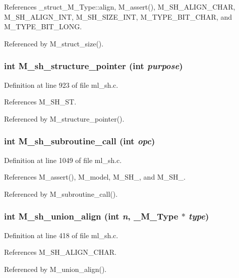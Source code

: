 References \_\-struct\_\-M\_\-Type::align, M\_\-assert(), M\_\-SH\_\-ALIGN\_\-CHAR, M\_\-SH\_\-ALIGN\_\-INT, M\_\-SH\_\-SIZE\_\-INT, M\_\-TYPE\_\-BIT\_\-CHAR, and M\_\-TYPE\_\-BIT\_\-LONG.

Referenced by M\_\-struct\_\-size().
\subsubsection{\setlength{\rightskip}{0pt plus 5cm}int M\_\-sh\_\-structure\_\-pointer (int {\em purpose})}\label{ml__sh_8c_6209ea8c8d083f24d1c154f9939a402d}




Definition at line 923 of file ml\_\-sh.c.

References M\_\-SH\_\-ST.

Referenced by M\_\-structure\_\-pointer().
\subsubsection{\setlength{\rightskip}{0pt plus 5cm}int M\_\-sh\_\-subroutine\_\-call (int {\em opc})}\label{ml__sh_8c_895bc24c27d58fe71769a3dbef15abb6}




Definition at line 1049 of file ml\_\-sh.c.

References M\_\-assert(), M\_\-model, M\_\-SH\_, and M\_\-SH\_.

Referenced by M\_\-subroutine\_\-call().
\subsubsection{\setlength{\rightskip}{0pt plus 5cm}int M\_\-sh\_\-union\_\-align (int {\em n}, \bf{\_\-M\_\-Type} $\ast$ {\em type})}\label{ml__sh_8c_0aaef67e02f1053679530eb4adbe0a84}




Definition at line 418 of file ml\_\-sh.c.

References M\_\-SH\_\-ALIGN\_\-CHAR.

Referenced by M\_\-union\_\-align().
